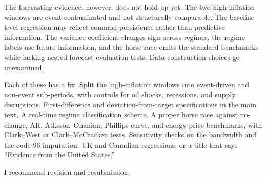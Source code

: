 \documentclass[11pt, a4paper]{article}
\begin{document}
The forecasting evidence, however, does not hold up yet. The two high-inflation windows are event-contaminated and not structurally comparable. The baseline level regression may reflect common persistence rather than predictive information. The variance coefficient changes sign across regimes, the regime labels use future information, and the horse race omits the standard benchmarks while lacking nested forecast evaluation tests. Data construction choices go unexamined.

Each of these has a fix. Split the high-inflation windows into event-driven and non-event sub-periods, with controls for oil shocks, recessions, and supply disruptions. First-difference and deviation-from-target specifications in the main text. A real-time regime classification scheme. A proper horse race against no-change, AR, Atkeson--Ohanian, Phillips curve, and energy-price benchmarks, with Clark--West or Clark--McCracken tests. Sensitivity checks on the bandwidth and the code-96 imputation. UK and Canadian regressions, or a title that says ``Evidence from the United States.''

I recommend revision and resubmission.
\end{document}
